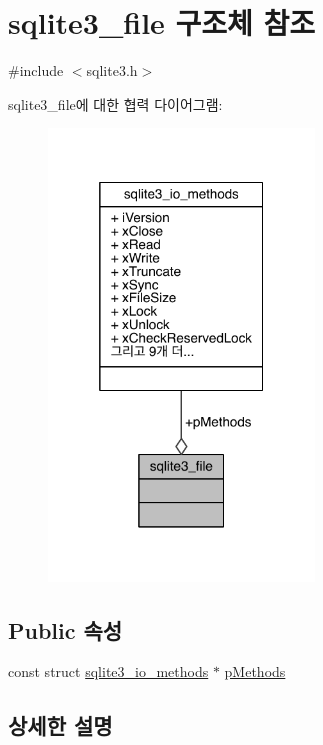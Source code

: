 \hypertarget{structsqlite3__file}{}\section{sqlite3\+\_\+file 구조체 참조}
\label{structsqlite3__file}


{\ttfamily \#include $<$sqlite3.\+h$>$}



sqlite3\+\_\+file에 대한 협력 다이어그램\+:
\nopagebreak
\begin{figure}[H]
\begin{center}
\leavevmode
\includegraphics[width=200pt]{structsqlite3__file__coll__graph}
\end{center}
\end{figure}
\subsection*{Public 속성}
\begin{DoxyCompactItemize}
\item 
const struct \hyperlink{structsqlite3__io__methods}{sqlite3\+\_\+io\+\_\+methods} $\ast$ \hyperlink{structsqlite3__file_adfc58b2d7514112375d7330e2881bc70}{p\+Methods}
\end{DoxyCompactItemize}


\subsection{상세한 설명}


